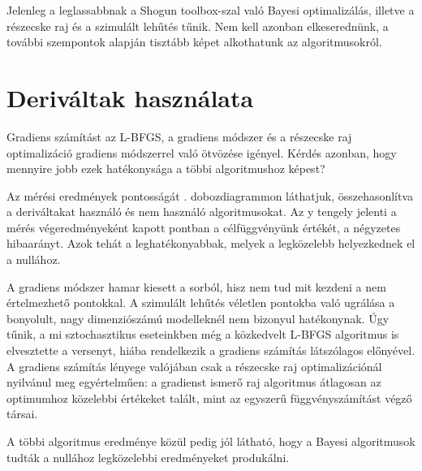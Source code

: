 Jelenleg a leglassabbnak a Shogun toolbox-szal való Bayesi optimalizálás, illetve a részecske raj és a szimulált lehűtés tűnik. Nem kell azonban elkeserednünk, a további szempontok alapján tisztább képet alkothatunk az algoritmusokról.
\section{Deriváltak használata}
\label{sec:derivaltak}
Gradiens számítást az L-BFGS, a gradiens módszer és a részecske raj optimalizáció gradiens módszerrel való ötvözése igényel. Kérdés azonban, hogy mennyire jobb ezek hatékonysága a többi algoritmushoz képest?

Az mérési eredmények pontosságát . dobozdiagrammon láthatjuk, összehasonlítva a deriváltakat használó és nem használó algoritmusokat. Az y tengely jelenti a mérés végeredményeként kapott pontban a célfüggvényünk értékét, a négyzetes hibaarányt. Azok tehát a leghatékonyabbak, melyek a legközelebb helyezkednek el a nullához.

A gradiens módszer hamar kiesett a sorból, hisz nem tud mit kezdeni a nem értelmezhető pontokkal. A szimulált lehűtés véletlen pontokba való ugrálása a bonyolult, nagy dimenziószámú modelleknél nem bizonyul hatékonynak. Úgy tűnik, a mi sztochasztikus eseteinkben még a közkedvelt L-BFGS algoritmus is elvesztette a versenyt, hiába rendelkezik a gradiens számítás látszólagos előnyével. A gradiens számítás lényege valójában csak a részecske raj optimalizációnál nyilvánul meg egyértelműen: a gradienst ismerő raj algoritmus átlagosan az optimumhoz közelebbi értékeket talált, mint az egyszerű függvényszámítást végző társai.

A többi algoritmus eredménye közül pedig jól látható, hogy a Bayesi algoritmusok tudták a nullához legközelebbi eredményeket produkálni.


